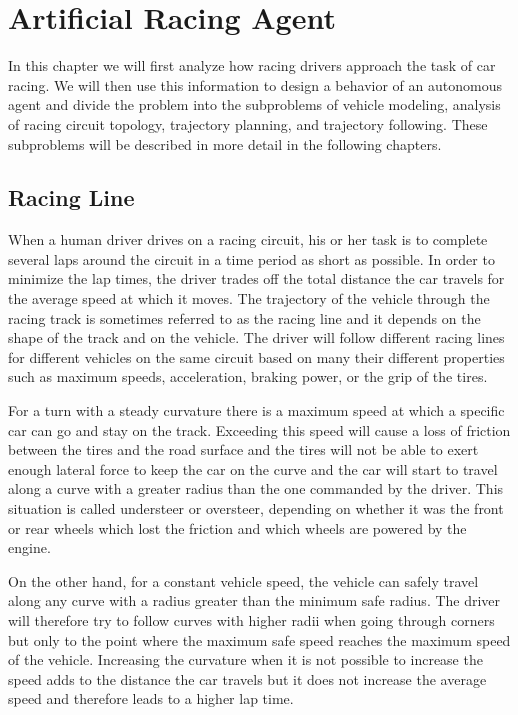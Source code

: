 \chapter{Artificial Racing Agent}

In this chapter we will first analyze how racing drivers approach the task of car racing. We will then use this information to design a behavior of an autonomous agent and divide the problem into the subproblems of vehicle modeling, analysis of racing circuit topology, trajectory planning, and trajectory following. These subproblems will be described in more detail in the following chapters.


\section{Racing Line}

When a human driver drives on a racing circuit, his or her task is to complete several laps around the circuit in a time period as short as possible. In order to minimize the lap times, the driver trades off the total distance the car travels for the average speed at which it moves. The trajectory of the vehicle through the racing track is sometimes referred to as the racing line and it depends on the shape of the track and on the vehicle. The driver will follow different racing lines for different vehicles on the same circuit based on many their different properties such as maximum speeds, acceleration, braking power, or the grip of the tires.

For a turn with a steady curvature there is a maximum speed at which a specific car can go and stay on the track. Exceeding this speed will cause a loss of friction between the tires and the road surface and the tires will not be able to exert enough lateral force to keep the car on the curve and the car will start to travel along a curve with a greater radius than the one commanded by the driver. This situation is called understeer or oversteer, depending on whether it was the front or rear wheels which lost the friction and which wheels are powered by the engine.


On the other hand, for a constant vehicle speed, the vehicle can safely travel along any curve with a radius greater than the minimum safe radius. The driver will therefore try to follow curves with higher radii when going through corners but only to the point where the maximum safe speed reaches the maximum speed of the vehicle. Increasing the curvature when it is not possible to increase the speed adds to the distance the car travels but it does not increase the average speed and therefore leads to a higher lap time.

